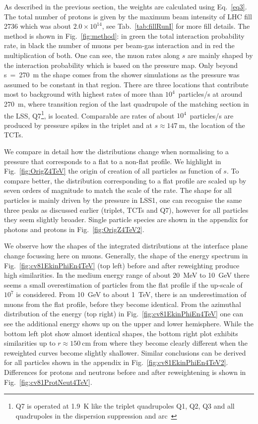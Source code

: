 As described in the previous section, the weights are calculated using Eq.~\ref{eq3}. The total number of protons is given by the maximum beam intensity of LHC fill 2736 which was about $2.0 \times 10^{14}$, see Tab.~\ref{tab:fillRunI} for more fill details. The method is shown in Fig.~\ref{fig:method}: in green the total interaction probability rate, in black the number of muons per beam-gas interaction and in red the multiplication of both. One can see, the muon rates along $s$ are mainly shaped by the interaction probability which is based on the pressure map. Only beyond s~=~270~m the shape comes from the shower simulations as the pressure was assumed to be constant in that region. There are three locations that contribute most to background with highest rates of more than $10^4$~particles/s at around 270~m, where transition region of the last quadrupole of the matching section in the LSS, Q7\footnote{Q7 is operated at 1.9~K like the triplet quadrupoles Q1, Q2, Q3 and all quadrupoles in the dispersion suppression and arc~\cite{LHCDesignRep}}, is located. Comparable are rates of about $10^4$~particles/s are produced by pressure spikes in the triplet and at $s \approx 147~$m, the location of the TCTs.

We compare in detail how the distributions change when normalising to a pressure that corresponds to a flat to a non-flat profile. We highlight in Fig.~\ref{fig:OrigZ4TeV} the origin of creation of all particles as function of $s$. To compare better, the distribution corresponding to a flat profile are scaled up by seven orders of magnitude to match the scale of the rate. The shape for all particles is mainly driven by the pressure in LSS1, one can recognise the same three peaks as discussed earlier (triplet, TCTs and Q7), however for all particles they seem slightly broader. Single particle species are shown in the appendix for photons and protons in Fig.~\ref{fig:OrigZ4TeV2}. 

We observe how the shapes of the integrated distributions at the interface plane change focussing here on muons. Generally, the shape of the energy spectrum in Fig.~\ref{fig:cv81EkinPhiEn4TeV} (top left) before and after reweighting produce high similarities. In the medium energy range of about 20~MeV to 10~GeV there seems a small overestimation of particles from the flat profile if the up-scale of $10^{7}$ is considered. From 10~GeV to about 1~TeV, there is an underestimation of muons from the flat profile, before they become identical. From the azimuthal distribution of the energy (top right) in Fig.~\ref{fig:cv81EkinPhiEn4TeV} one can see the additional energy shows up on the upper and lower hemisphere. While the bottom left plot show almost identical shapes, the bottom right plot exhibits similarities up to $r \approx 150~$cm from where they become clearly different when the reweighted curves become slightly shallower. Similar conclusions can be derived for all particles shown in the appendix in Fig.~\ref{fig:cv81EkinPhiEn4TeV2}. Differences for protons and neutrons before and after reweightening is shown in Fig.~\ref{fig:cv81ProtNeut4TeV}.


